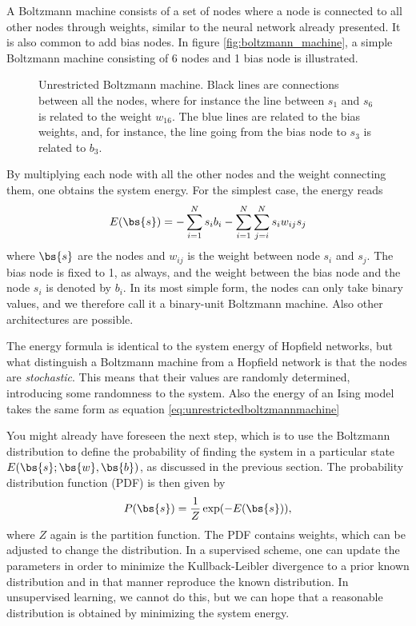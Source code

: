 A Boltzmann machine consists of a set of nodes where a node is connected to all other nodes through weights, similar to the neural network already presented. It is also common to add bias nodes. In figure \eqref{fig:boltzmann_machine}, a simple Boltzmann machine consisting of 6 nodes and 1 bias node is illustrated. 

\begin{figure}
	\centering
	
	\caption{Unrestricted Boltzmann machine. Black lines are connections between all the nodes, where for instance the line between $s_1$ and $s_6$ is related to the weight $w_{16}$. The blue lines are related to the bias weights, and, for instance, the line going from the bias node to $s_3$ is related to $b_3$.}
	\label{fig:boltzmann_machine}
\end{figure}

By multiplying each node with all the other nodes and the weight connecting them, one obtains the system energy. For the simplest case, the energy reads
\begin{equation}
E(\bs{s})=- \sum_{i=1}^Ns_ib_i-\sum_{i=1}^N\sum_{j=i}^N s_iw_{ij}s_j 
\label{eq:unrestrictedboltzmannmachine}
\end{equation}
where $\bs{s}$ are the nodes and $w_{ij}$ is the weight between node $s_i$ and $s_j$. The bias node is fixed to 1, as always, and the weight between the bias node and the node $s_i$ is denoted by $b_i$. In its most simple form, the nodes can only take binary values, and we therefore call it a binary-unit Boltzmann machine. Also other architectures are possible. 

The energy formula is identical to the system energy of Hopfield networks, but what distinguish a Boltzmann machine from a Hopfield network is that the nodes are \textit{stochastic}. This means that their values are randomly determined, introducing some randomness to the system. Also the energy of an Ising model takes the same form as equation \eqref{eq:unrestrictedboltzmannmachine}

You might already have foreseen the next step, which is to use the Boltzmann distribution to define the probability of finding the system in a particular state $E(\bs{s};\bs{w},\bs{b})$, as discussed in the previous section. The probability distribution function (PDF) is then given by
\begin{equation}
P(\bs{s})=\frac{1}{Z}\exp(-E(\bs{s})),
\label{eq:boltzmanndist}
\end{equation}
where $Z$ again is the partition function. The PDF contains weights, which can be adjusted to change the distribution. In a supervised scheme, one can update the parameters in order to minimize the Kullback-Leibler divergence to a prior known distribution and in that manner reproduce the known distribution. In unsupervised learning, we cannot do this, but we can hope that a reasonable distribution is obtained by minimizing the system energy.

